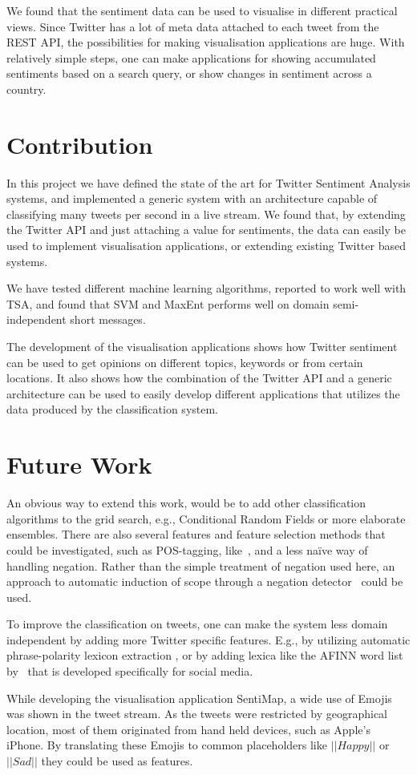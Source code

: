 We found that the sentiment data can be used to visualise in different practical views. Since Twitter has a lot of meta data attached to each tweet from the REST API, the possibilities for making visualisation applications are huge. With relatively simple steps, one can make applications for showing accumulated sentiments based on a search query, or show changes in sentiment across a country.

\section{Contribution}

In this project we have defined the state of the art for Twitter Sentiment Analysis systems, and implemented a generic system with an architecture capable of classifying many tweets per second in a live stream. We found that, by extending the Twitter API and just attaching a value for sentiments, the data can easily be used to implement visualisation applications, or extending existing Twitter based systems. 

We have tested different machine learning algorithms, reported to work well with TSA, and found that SVM and MaxEnt performs well on domain semi-independent short messages.

The development of the visualisation applications shows how Twitter sentiment can be used to get opinions on different topics, keywords or from certain locations. It also shows how the combination of the Twitter API and a generic architecture can be used to easily develop different applications that utilizes the data produced by the classification system.

\section{Future Work}

An obvious way to extend this work, would be to add other classification algorithms to the grid search, e.g., Conditional Random Fields or more elaborate ensembles. There are also several
features and feature selection methods that could be investigated, such as POS-tagging, like~\cite{article:pak}, and a less na\"{i}ve way of handling negation. Rather than the simple treatment of negation used here, an approach to automatic induction of scope through a negation detector~\citep{CouncillEA:10} could be used.

To improve the classification on tweets, one can make the system less domain independent by adding more Twitter specific features. E.g., by utilizing automatic phrase-polarity lexicon extraction \citep{VelikovichEA:10}, or by adding lexica like the AFINN word list by~\cite{article:afinn} that is developed specifically for social media.

While developing the visualisation application SentiMap, a wide use of Emojis was shown in the tweet stream. As the tweets were restricted by geographical location, most of them originated from hand held devices, such as Apple's iPhone. By translating these Emojis to common placeholders like $||Happy||$ or $||Sad||$ they could be used as features.
